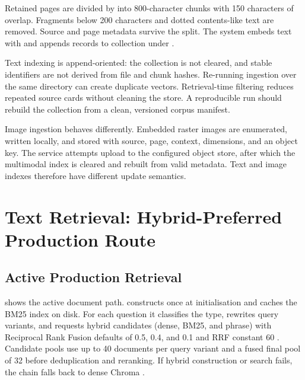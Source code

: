 Retained pages are divided by  into 800-character chunks with 150 characters of overlap. Fragments below 200 characters and dotted contents-like text are removed. Source and page metadata survive the split. The system embeds text with  \parencite{reimers2019,minilmModelCard} and appends records to collection  under .

Text indexing is append-oriented: the collection is not cleared, and stable identifiers are not derived from file and chunk hashes. Re-running ingestion over the same directory can create duplicate vectors. Retrieval-time filtering reduces repeated source cards without cleaning the store. A reproducible run should rebuild the collection from a clean, versioned corpus manifest.

Image ingestion behaves differently. Embedded raster images are enumerated, written locally, and stored with source, page, context, dimensions, and an object key. The service attempts upload to the configured object store, after which the multimodal index is cleared and rebuilt from valid metadata. Text and image indexes therefore have different update semantics.

\section{Text Retrieval: Hybrid-Preferred Production Route}
\label{sec:text-retrieval}

\subsection{Active Production Retrieval}
\label{subsec:active-text-retrieval}

 shows the active document path.  constructs  once at initialisation and caches the BM25 index on disk. For each question it classifies the type, rewrites query variants, and requests hybrid candidates (dense, BM25, and phrase) with Reciprocal Rank Fusion defaults of 0.5, 0.4, and 0.1 and RRF constant 60 \parencite{karpukhin2020,robertson2009,cormack2009,reimers2019}. Candidate pools use up to 40 documents per query variant and a fused final pool of 32 before deduplication and reranking. If hybrid construction or search fails, the chain falls back to dense Chroma .

